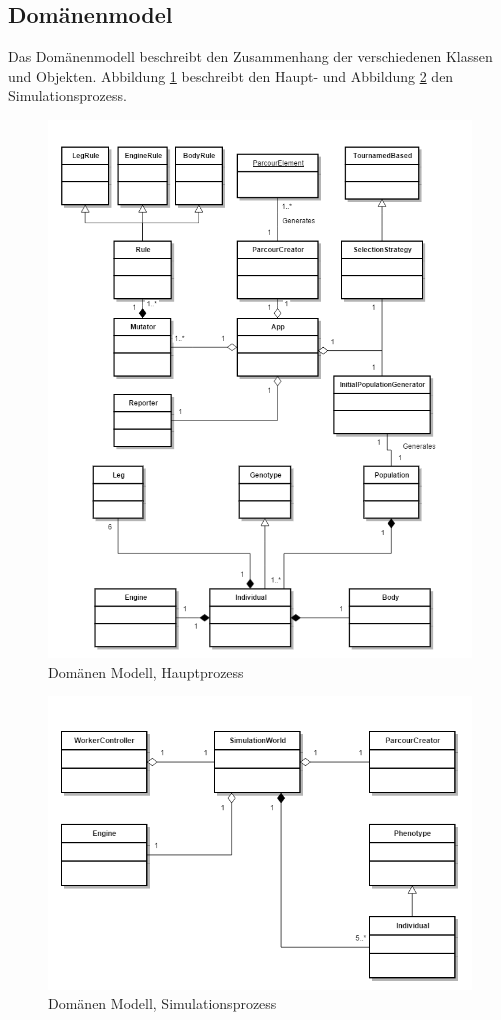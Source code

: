     \subsection{Domänenmodel\label{sub:domMod}}
      Das Domänenmodell beschreibt den Zusammenhang der verschiedenen Klassen und Objekten.
      Abbildung \ref{fig:mainProcess} beschreibt den Haupt- und Abbildung \ref{fig:simulationProcess} den Simulationsprozess.
      \begin{figure}[H]
        \includegraphics[scale=0.6]{graphics/main_process}
        \caption{Domänen Modell, Hauptprozess}
        \label{fig:mainProcess}
      \end{figure}
      \begin{figure}[H]
        \includegraphics[scale=0.6]{graphics/simulation_process}
        \caption{Domänen Modell, Simulationsprozess}
        \label{fig:simulationProcess}
      \end{figure}
